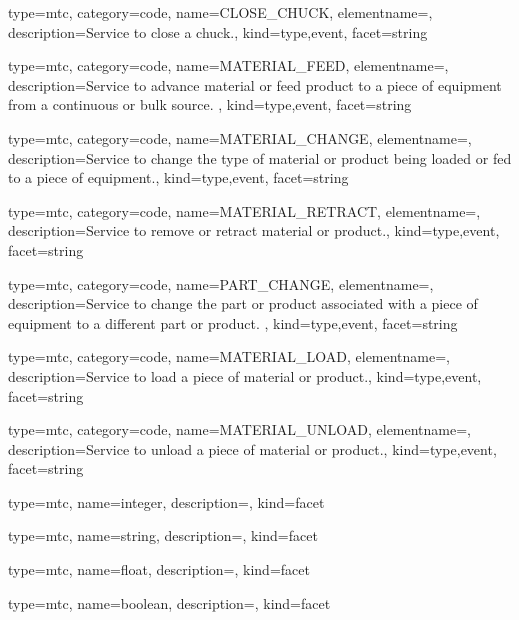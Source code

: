 {
  type=mtc,
  category=code,
  name={CLOSE\_CHUCK},
  elementname=,
  description={Service to close a chuck.},
  kind={type,event},
  facet={\gls{string}}
}


{
  type=mtc,
  category=code,
  name={MATERIAL\_FEED},
  elementname=,
  description={Service to advance material or feed product to a piece of equipment from a continuous or bulk source. },
  kind={type,event},
  facet={\gls{string}}
}


{
  type=mtc,
  category=code,
  name={MATERIAL\_CHANGE},
  elementname=,
  description={Service to change the type of material or product being loaded or fed to a piece of equipment.},
  kind={type,event},
  facet={\gls{string}}
}


{
  type=mtc,
  category=code,
  name={MATERIAL\_RETRACT},
  elementname=,
  description={Service to remove or retract material or product.},
  kind={type,event},
  facet={\gls{string}}
}


{
  type=mtc,
  category=code,
  name={PART\_CHANGE},
  elementname=,
  description={Service to change the part or product associated with a piece of equipment to a different part or product.  },
  kind={type,event},
  facet={\gls{string}}
}


{
  type=mtc,
  category=code,
  name={MATERIAL\_LOAD},
  elementname=,
  description={Service to load a piece of material or product.},
  kind={type,event},
  facet={\gls{string}}
}


{
  type=mtc,
  category=code,
  name={MATERIAL\_UNLOAD},
  elementname=,
  description={Service to unload a piece of material or product.},
  kind={type,event},
  facet={\gls{string}}
}


{
  type=mtc,
  name={integer},
  description={},
  kind={facet}
}


{
  type=mtc,
  name={string},
  description={},
  kind={facet}
}


{
  type=mtc,
  name={float},
  description={},
  kind={facet}
}


{
  type=mtc,
  name={boolean},
  description={},
  kind={facet}
}



